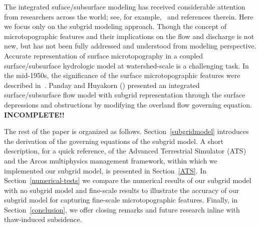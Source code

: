\documentclass[review,11pt]{elsarticle}
\begin{document}
The integrated suface/subsurface modeling has received considerable attention from researchers across the world; see, for example,~\cite{painter2013modeling,kurylyk2014climate,spainter2016integrated} and references therein. Here we focus only on the subgrid modeling approach. Though the concept of microtopographic features and their implications on the flow and discharge is not new, but has not been fully addressed and understood from modeling perspective. Accurate representation of surface microtopography in a coupled surface/subsurface hydrologic model at watershed-scale is a challenging task. In the mid-1950s, the significance of the surface microtopographic features were described in~\cite{stammers1956effect}. Panday and Huyakorn (\citeyear{panday2004fully}) presented an integrated surface/subsurface flow model with subgrid representation through the surface depressions and obstructions by modifying the overland flow governing equation. \textbf{INCOMPLETE!!}

The rest of the paper is organized as follows. Section~\ref{subgridmodel} introduces the derivation of the governing equations of the subgrid model. A short description, for a quick reference, of the Advanced Terrestrial Simulator (ATS) and the Arcos multiphysics management framework, within which we implemented our subgrid model, is presented in Section~\ref{ATS}. In Section~\ref{numerical-tests} we compare the numerical results of our subgrid model with no subgrid model and fine-scale results to illustrate the accuracy of our subgrid model for capturing fine-scale microtopographic features. Finally, in Section~\ref{conclusion}, we offer closing remarks and future research inline with thaw-induced subsidence.
\end{document}
